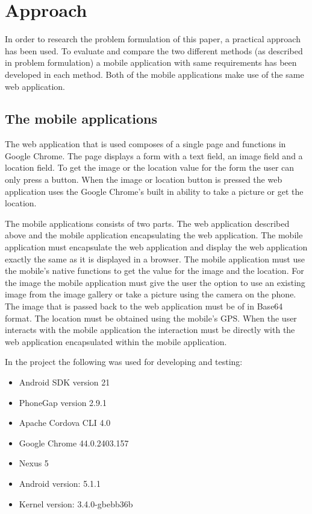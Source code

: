 
\chapter{Approach}
In order to research the problem formulation of this paper, a practical approach has been used. To evaluate and compare the two different methods (as described in problem formulation) a mobile application with same requirements has been developed in each method. Both of the mobile applications make use of the same web application. 

\section{The mobile applications}
The web application that is used composes of a single page and functions in Google Chrome. The page displays a form with a text field, an image field and a location field. To get the image or the location value for the form the user can only press a button. When the image or location button is pressed the web application uses the Google Chrome’s built in ability to take a picture or get the location.

The mobile applications consists of two parts. The web application described above and the mobile application encapsulating the web application. The mobile application must encapsulate the web application and display the web application exactly the same as it is displayed in a browser. The mobile application must use the mobile’s native functions to get the value for the image and the location. For the image the mobile application must give the user the option to use an existing image from the image gallery or take a picture using the camera on the phone. The image that is passed back to the web application must be of in Base64 format. The location must be obtained using the mobile’s GPS. When the user interacts with the mobile application the interaction must be directly with the web application encapsulated within the mobile application. 

In the project the following was used for developing and testing:
\begin{itemize}
\item Android SDK version 21
\item PhoneGap version 2.9.1
\item Apache Cordova CLI 4.0
\item Google Chrome 44.0.2403.157
\item Nexus 5
\item Android version: 5.1.1
\item Kernel version: 3.4.0-gbebb36b
\end{itemize}

